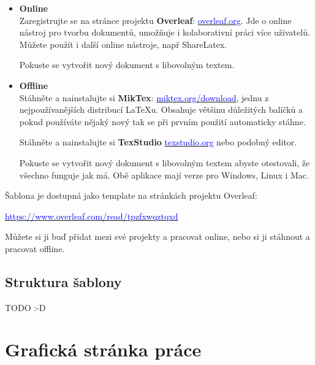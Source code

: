 \begin{itemize}

\item \textbf{Online}\\
Zaregistrujte se na stránce projektu \textbf{Overleaf}: \href{https://www.overleaf.com/signup?ref=e484ea92ee94}{\textcolor{blue}{overleaf.org}}. Jde o online nástroj pro tvorbu dokumentů, umožňuje i kolaborativní práci více uživatelů. Můžete použít i další online nástroje, např ShareLatex.

Pokuste se vytvořit nový dokument s libovolným textem.

\item \textbf{Offline}\\
Stáhněte a nainstalujte si \textbf{MikTex}: \href{https://miktex.org/download}{\textcolor{blue}{miktex.org/download}}, jednu z nejpoužívanějších distribucí LaTeXu. Obsahuje většinu důležitých balíčků a pokud používáte nějaký nový tak se při prvním použití automaticky stáhne.

Stáhněte a nainstalujte si \textbf{TexStudio} \href{https://www.texstudio.org/}{\textcolor{blue}{texstudio.org}} nebo podobný editor. 

Pokuste se vytvořit nový dokument s libovolným textem abyste otestovali, že všechno funguje jak má. Obě aplikace mají verze pro Windows, Linux i Mac.

\end{itemize}

Šablona je dostupná jako template na stránkách projektu Overleaf:
\vspace{-0.55cm}
\begin{center}
\large\href{https://www.overleaf.com/read/tpzfxwqztqxd}{\textcolor{blue}{https://www.overleaf.com/read/tpzfxwqztqxd}}
\end{center}

\vspace{-0.2cm}
Můžete si ji buď přidat mezi své projekty a pracovat online, nebo si ji stáhnout a pracovat offline.


\section{Struktura \v{s}ablony}
TODO :-D




\chapter{Grafick\'{a} str\'{a}nka pr\'{a}ce}
\label{chap:grafika}

